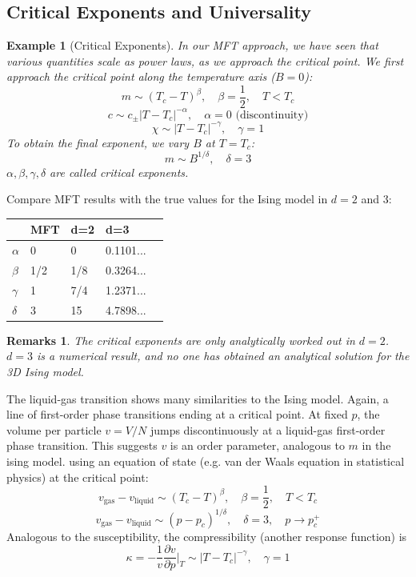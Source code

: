 \documentclass[a4paper]{article}
\newtheorem{eg}{Example}[section]
\newtheorem{remarks}{Remarks}[section]
\theoremstyle{new}
\begin{document}
\subsection{Critical Exponents and Universality}
\begin{eg}[Critical Exponents]
In our MFT approach, we have seen that various quantities scale as power laws, as we approach the critical point. We first approach the critical point along the temperature axis ($B=0$):
$$m\sim(T_c-T)^\beta,\quad\beta=\frac{1}{2},\quad T<T_c$$
$$c\sim c_\pm|T-T_c|^{-\alpha},\quad\alpha=0\text{ (discontinuity)}$$
$$\chi\sim|T-T_c|^{-\gamma},\quad\gamma=1$$
To obtain the final exponent, we vary $B$ at $T=T_c$:
$$m\sim B^{1/\delta},\quad\delta=3$$
$\alpha,\beta,\gamma,\delta$ are called critical exponents.
\end{eg}
Compare MFT results with the true values for the Ising model in $d=2$ and 3:
\begin{table}[H]
\centering
\begin{tabular}{|l|l|l|l|l|}
\hline
      & MFT & d=2 & d=3         \\
      \hline
$\alpha$ & 0   & 0   & 0.1101...   \\
 \hline
$\beta$  & 1/2 & 1/8 & 0.3264...   \\
 \hline
$\gamma$ & 1   & 7/4 & 1.2371...   \\
 \hline
$\delta$ & 3   & 15  & 4.7898...  \\
\hline
\end{tabular}
\end{table}
\begin{remarks}
The critical exponents are only analytically worked out in $d=2$. $d=3$ is a numerical result, and no one has obtained an analytical solution for the 3D Ising model.
\end{remarks}
The liquid-gas transition shows many similarities to the Ising model. Again, a line of first-order phase transitions ending at a critical point. At fixed $p$, the volume per particle $v=V/N$ jumps discontinuously at a liquid-gas first-order phase transition. This suggests $v$ is an order parameter, analogous to $m$ in the ising model. using an equation of state (e.g. van der Waals equation in statistical physics) at the critical point:
$$v_{\text{gas}}-v_{\text{liquid}}\sim(T_c-T)^\beta,\quad\beta=\frac{1}{2},\quad T<T_c$$
$$v_{\text{gas}}-v_{\text{liquid}}\sim(p-p_c)^{1/\delta},\quad\delta=3,\quad p\rightarrow p_c^+$$
Analogous to the susceptibility, the compressibility (another response function) is
$$\kappa=-\frac{1}{v}\frac{\partial v}{\partial p}\bigg|_T\sim|T-T_c|^{-\gamma},\quad\gamma=1$$
\end{document}
